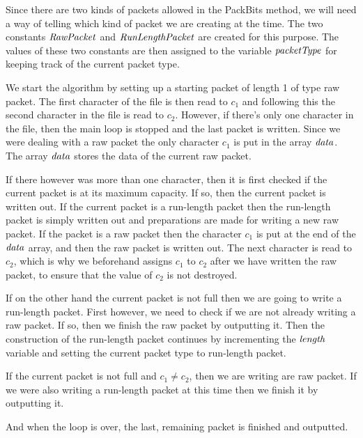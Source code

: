 Since there are two kinds of packets allowed in the PackBits \rle
method, we will need a way of telling which kind of packet we are
creating at the time. The two constants $\mathit{RawPacket}$ and
$\mathit{RunLengthPacket}$ are created for this purpose. The values of these
two constants are then assigned to the variable $\mathit{packetType}$ for
keeping track of the current packet type.

We start the algorithm by setting up a starting packet of length 1 of
type raw packet. The first character of the file is then read to $c_1$
and following this the second character in the file is read to
$c_2$. However, if there's only one character in the file, then the
main loop is stopped and the last packet is written. Since we were
dealing with a raw packet the only character $c_1$ is put in the array
$\mathit{data}$. The array $\mathit{data}$ stores the data of the current
raw packet.

If there however was more than one character, then it is first checked
if the current packet is at its maximum capacity. If so, then the
current packet is written out. If the current packet is a run-length
packet then the run-length packet is simply written out and
preparations are made for writing a new raw packet. If the packet is a
raw packet then the character $c_1$ is put at the end of the $\mathit{data}$
array, and then the raw packet is written out. The next character is
read to $c_2$, which is why we beforehand assigns $c_1$ to $c_2$ after
we have written the raw packet, to ensure that the value of $c_2$ is
not destroyed.

If on the other hand the current packet is not full then we are going
to write a run-length packet. First however, we need to check if we
are not already writing a raw packet. If so, then we finish the raw
packet by outputting it. Then the construction of the run-length
packet continues by incrementing the $\mathit{length}$ variable and setting the
current packet type to run-length packet.

If the current packet is not full and $c_1 \neq c_2$, then we are
writing are raw packet. If we were also writing a run-length packet at
this time then we finish it by outputting it.

And when the loop is over, the last, remaining packet is finished and
outputted.

